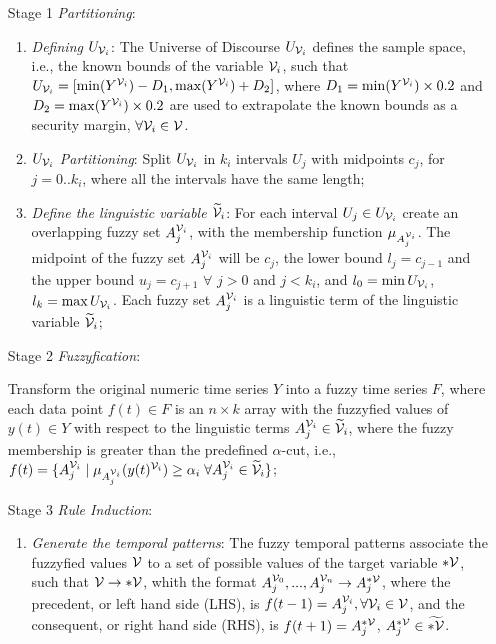 \begin{enumerate}
\item[Stage 1] \textit{Partitioning}:
\begin{enumerate}
\item \textit{Defining $U_{\mathcal{V}_i}$}: The Universe of Discourse $U_{\mathcal{V}_i}$ defines the sample space, i.e., the known bounds of the variable $\mathcal{V}_i$, such that $U_{\mathcal{V}_i} = [\min(Y^{\mathcal{V}_i})-D_1, \max(Y^{\mathcal{V}_i})+D_2]$, where $D_1 = \min(Y^{\mathcal{V}_i})\times 0.2$ and $D_2 = \max(Y^{\mathcal{V}_i})\times 0.2$ are used to extrapolate the known bounds as a security margin, $\forall \mathcal{V}_i \in \mathcal{V}$.

\item \textit{$U_{\mathcal{V}_i}$ Partitioning}: Split $U_{\mathcal{V}_i}$ in $k_i$ intervals $U_j$ with midpoints $c_j$, for $j=0..k_i$, where all the intervals have the same length;

\index{$\mlvar$}
\item \textit{Define the linguistic variable $\mlvar$}: For each interval $U_j \in U_{\mathcal{V}_i}$  create an overlapping fuzzy set $A_j^{\mathcal{V}_i}$, with the membership function $\mu_{A_j^{\mathcal{V}_i}}$. The midpoint of the fuzzy set $A_j^{\mathcal{V}_i}$ will be $c_j$, the lower bound $l_j = c_{j-1}$ and the upper bound $u_j = c_{j+1}$ $\forall$ $j >0$ and $j < k_i$, and $l_0 = \min U_{\mathcal{V}_i}$, $l_k = \max U_{\mathcal{V}_i}$. Each fuzzy set $A_j^{\mathcal{V}_i}$ is a linguistic term of the linguistic variable $\mlvar$;
\end{enumerate}

\item[Stage 2] \textit{Fuzzyfication}: 

Transform the original numeric time series $Y$ into a fuzzy time series $F$, where each data point $f(t) \in F$ is an $n \times k$ array with the fuzzyfied values of $y(t) \in Y$ with respect to the linguistic terms $A_j^{\mathcal{V}_i} \in \widetilde{\mathcal{V}}_i$, where the fuzzy membership is greater than the predefined $\alpha$-cut, i.e., $f(t) = \{A_j^{\mathcal{V}_i}\; |\; \mu_{A_j^{\mathcal{V}_i}}(y(t)^{\mathcal{V}_i}) \geq \alpha_i\;\forall A_j^{\mathcal{V}_i} \in \widetilde{\mathcal{V}}_i\}$;

\item[Stage 3] \textit{Rule Induction}: 
\begin{enumerate}
\item \textit{Generate the temporal patterns}: The fuzzy temporal patterns associate the fuzzyfied values $\mathcal{V}$ to a set of possible values of the target variable $*\mathcal{V}$, such that $\mathcal{V} \rightarrow *\mathcal{V}$, whith the format $A_j^{\mathcal{V}_0},...,A_j^{\mathcal{V}_n} \rightarrow A_j^{*\mathcal{V}}$, where the precedent, or left hand side (LHS), is $f(t - 1) = A_j^{\mathcal{V}_i}, \forall \mathcal{V}_i \in \mathcal{V}$, and the consequent, or right hand side (RHS), is $f(t+1) = A_j^{*\mathcal{V}}$, $A_j^{*\mathcal{V}} \in \widetilde{*\mathcal{V}}$.


\end{enumerate}
\end{enumerate}
